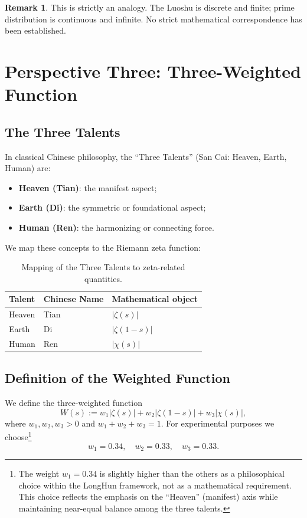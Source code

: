 \documentclass[11pt,a4paper]{article}
\theoremstyle{definition}
\newtheorem{remark}{Remark}[section]
\begin{document}
\begin{remark}
This is strictly an analogy. The Luoshu is discrete and finite; prime distribution is continuous and infinite. No strict mathematical correspondence has been established.
\end{remark}

\section{Perspective Three: Three-Weighted Function}

\subsection{The Three Talents}

In classical Chinese philosophy, the ``Three Talents'' (San Cai: Heaven, Earth, Human) are:

\begin{itemize}
    \item \textbf{Heaven (Tian)}: the manifest aspect;
    \item \textbf{Earth (Di)}: the symmetric or foundational aspect;
    \item \textbf{Human (Ren)}: the harmonizing or connecting force.
\end{itemize}

We map these concepts to the Riemann zeta function:

\begin{table}[h]
\centering
\begin{tabular}{@{}lll@{}}
\toprule
Talent & Chinese Name & Mathematical object \\
\midrule
Heaven & Tian & $|\zeta(s)|$ \\
Earth & Di & $|\zeta(1-s)|$ \\
Human & Ren & $|\chi(s)|$ \\
\bottomrule
\end{tabular}
\caption{Mapping of the Three Talents to zeta-related quantities.}
\end{table}

\subsection{Definition of the Weighted Function}

We define the three-weighted function
\begin{equation}
    W(s) := w_1 |\zeta(s)| + w_2 |\zeta(1-s)| + w_3 |\chi(s)|,
\end{equation}
where $w_1, w_2, w_3 > 0$ and $w_1 + w_2 + w_3 = 1$. For experimental purposes we choose\footnote{The weight $w_1 = 0.34$ is slightly higher than the others as a philosophical choice within the LongHun framework, not as a mathematical requirement. This choice reflects the emphasis on the ``Heaven'' (manifest) axis while maintaining near-equal balance among the three talents.}
\begin{equation}
    w_1 = 0.34, \quad w_2 = 0.33, \quad w_3 = 0.33.
\end{equation}
\end{document}
